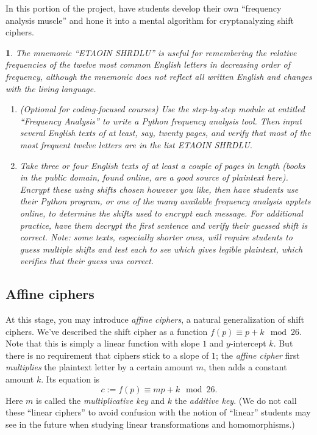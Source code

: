 \documentclass[11pt]{article}
\theoremstyle{plain}
\theoremstyle{remark}
\theoremstyle{definition}
\theoremstyle{definition}
\theoremstyle{definition}
\theoremstyle{plain}
\theoremstyle{plain}
\theoremstyle{plain}
\newtheorem{act}[thm]{\protect\activityname}
\theoremstyle{definition}
\providecommand{\activityname}{Activity}
\begin{document}
In this portion of the project, have students develop their own ``frequency
analysis muscle'' and hone it into a mental algorithm for cryptanalyzing
shift ciphers. 

\begin{act}
	The mnemonic ``ETAOIN SHRDLU'' is useful for remembering the relative frequencies of the twelve most common English letters in decreasing order of frequency, although the mnemonic does not reflect all written English and changes with the living language. 
	\begin{enumerate}
		\item (Optional for coding-focused courses) Use the step-by-step module at \cite{inceResourcesFirstYearCollege2022} entitled ``Frequency Analysis'' to write a Python frequency analysis tool. Then input several English texts of at least, say, twenty pages, and verify that most of the most frequent twelve letters	are in the list ETAOIN SHRDLU.
		\item Take three or four English texts of at least a couple of pages in length (books in the public domain, found online, are a good source of plaintext here). Encrypt these using shifts chosen however you like, then have students use their Python program, or one of the many available frequency analysis applets online, to determine the shifts used to encrypt each message. For additional practice, have them decrypt the first sentence and verify their guessed shift is correct. \textit{Note}: some texts, especially shorter ones, will require students to guess multiple shifts and test each to see which gives legible plaintext, which verifies that their guess was correct.
	\end{enumerate}
	
\end{act}

\subsection{Affine ciphers}

At this stage, you may introduce \textit{affine
ciphers}, a natural generalization of shift ciphers. We've described
the shift cipher as a function $f(p)\equiv p+k\mod26$. Note that
this is simply a linear function with slope $1$ and $y$-intercept
$k$. But there is no requirement that ciphers stick to a slope of
$1$; the \textit{affine cipher} first \emph{multiplies }the plaintext
letter by a certain amount $m$, then adds a constant amount $k$.
Its equation is 
\begin{equation}
c:=f(p)\equiv mp+k\mod26.\label{KI-eq:affine-cipher}
\end{equation}
Here $m$ is called the \textit{multiplicative key} and $k$ the \textit{additive
key}. (We do not call these ``linear ciphers'' to avoid confusion
with the notion of ``linear'' students may see in
the future when studying linear transformations and homomorphisms.)
\end{document}
